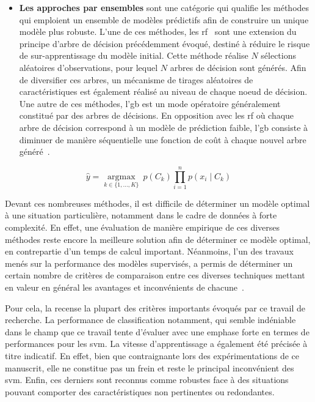 \begin{itemize}
    \item \textbf{Les approches par ensembles} sont une catégorie qui qualifie les méthodes qui emploient un ensemble de modèles prédictifs afin de construire un unique modèle plus robuste. L'une de ces méthodes, les \gls{rf}~\cite{Breiman2001} sont une extension du principe d'arbre de décision précédemment évoqué, destiné à réduire le risque de sur-apprentissage du modèle initial. Cette méthode réalise $N$ sélections aléatoires d'observations, pour lequel $N$ arbres de décision sont générés. Afin de diversifier ces arbres, un mécanisme de tirages aléatoires de caractéristiques est également réalisé au niveau de chaque noeud de décision. Une autre de ces méthodes, l'\gls{gb} est un mode opératoire généralement constitué par des arbres de décisions. En opposition avec les \gls{rf} où chaque arbre de décision correspond à un modèle de prédiction faible, l'\gls{gb} consiste à diminuer de manière séquentielle une fonction de coût à chaque nouvel arbre généré~\cite{Friedman2001}.
\end{itemize}\par

\begin{equation} 
    \label{eq:bayesian}
    \hat{y} = \underset{k \in \{1, \ldots, K\}}{\operatorname{argmax}} \ p(C_k) \displaystyle\prod_{i=1}^n p(x_i \mid C_k)
\end{equation}

Devant ces nombreuses méthodes, il est difficile de déterminer un modèle optimal à une situation particulière, notamment dans le cadre de données à forte complexité. En effet, une évaluation de manière empirique de ces diverses méthodes reste encore la meilleure solution afin de déterminer ce modèle optimal, en contrepartie d'un temps de calcul important. Néanmoins, l'un des travaux menés sur la performance des modèles supervisés, a permis de déterminer un certain nombre de critères de comparaison entre ces diverses techniques mettant en valeur en général les avantages et inconvénients de chacune~\cite{Kotsiantis2007}.\par

Pour cela, la  recense la plupart des critères importants évoqués par ce travail de recherche. La performance de classification notamment, qui semble indéniable dans le champ que ce travail tente d'évaluer avec une emphase forte en termes de performances pour les \gls{svm}. La vitesse d'apprentissage a également été précisée à titre indicatif. En effet, bien que contraignante lors des expérimentations de ce manuscrit, elle ne constitue pas un frein et reste le principal inconvénient des \gls{svm}. Enfin, ces derniers sont reconnus comme robustes face à des situations pouvant comporter des caractéristiques non pertinentes ou redondantes.\par

